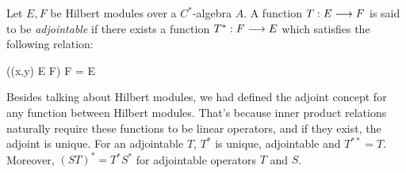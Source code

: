 \begin{definicao}
    Let $E, F$ be Hilbert modules over a $C^*$-algebra $A$. A function $T:E\longrightarrow F$ is said to be \textit{adjointable} if there exists a function $T^*: F\longrightarrow E$ which satisfies the following relation:
    \begin{eqspaced*}{((x,y) \in E \times F)}
    F = E
    \end{eqspaced*}
    Besides talking about Hilbert modules, we had defined the adjoint concept for any function between Hilbert modules. That's because inner product relations naturally require these functions to be linear operators, and if they exist, the adjoint is unique. For an adjointable $T$, $T^*$ is unique, adjointable and $T^{**} = T$. Moreover, $(ST)^* = T^*S^*$ for adjointable operators $T$ and $S$.
\end{definicao}
    
